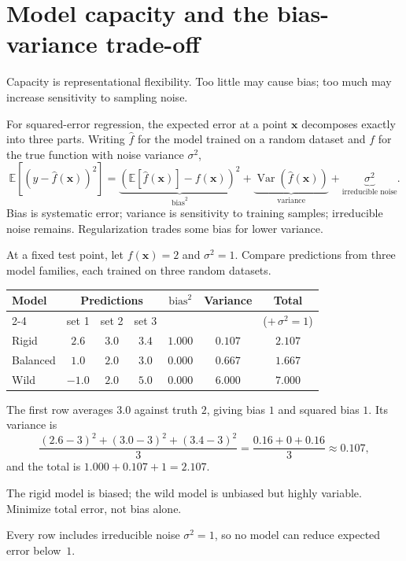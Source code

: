\section{Model capacity and the bias-variance trade-off}\label{sec:bias-variance}

Capacity is representational flexibility. Too little may cause bias; too much may increase sensitivity to sampling noise.

For squared-error regression, the expected error at a point $\bm{x}$ decomposes exactly into three parts. Writing $\hat{f}$ for the model trained on a random dataset and $f$ for the true function with noise variance $\sigma^2$,
\[
  \mathbb{E}\!\left[{(y-\hat{f}(\bm{x}))}^2\right]
  =\underbrace{{\left(\mathbb{E}[\hat{f}(\bm{x})]-f(\bm{x})\right)}^2}_{\text{bias}^2}
  +\underbrace{\operatorname{Var}\!\left(\hat{f}(\bm{x})\right)}_{\text{variance}}
  +\underbrace{\sigma^2}_{\text{irreducible noise}}.
\]
Bias is systematic error; variance is sensitivity to training samples; irreducible noise remains. Regularization trades some bias for lower variance.

\begin{workedexample}
At a fixed test point, let $f(\bm{x})=2$ and $\sigma^2=1$. Compare predictions from three model families, each trained on three random datasets.

\begin{mltable}\small
\begin{tabular}{lcccccc}
\toprule
\rowcolor{MLPaleBlue!92}
Model & \multicolumn{3}{c}{Predictions} & $\text{bias}^2$ & Variance & Total \\
\cmidrule(lr){2-4}
 & set 1 & set 2 & set 3 & & & ($+\,\sigma^2=1$) \\
\midrule
Rigid    & $2.6$  & $3.0$ & $3.4$ & $1.000$ & $0.107$ & $\mathbf{2.107}$ \\
Balanced & $1.0$  & $2.0$ & $3.0$ & $0.000$ & $0.667$ & $\mathbf{1.667}$ \\
Wild     & $-1.0$ & $2.0$ & $5.0$ & $0.000$ & $6.000$ & $\mathbf{7.000}$ \\
\bottomrule
\end{tabular}
\end{mltable}

The first row averages $3.0$ against truth $2$, giving bias $1$ and squared bias $1$. Its variance is
\[
  \frac{{(2.6-3)}^2+{(3.0-3)}^2+{(3.4-3)}^2}{3}=\frac{0.16+0+0.16}{3}\approx 0.107,
\]
and the total is $1.000+0.107+1=2.107$.

The rigid model is biased; the wild model is unbiased but highly variable. Minimize total error, not bias alone.

Every row includes irreducible noise $\sigma^2=1$, so no model can reduce expected error below~$1$.
\end{workedexample}

